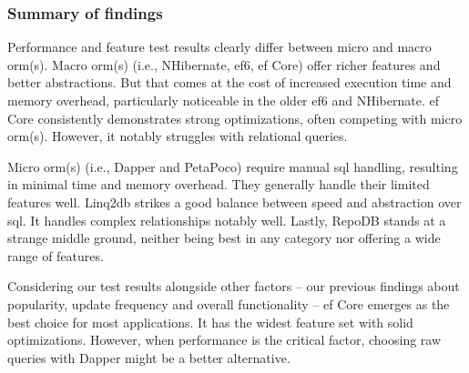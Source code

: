 \subsubsection{Summary of findings}
Performance and feature test results clearly differ between micro and macro \acrshort{orm}(s). Macro \acrshort{orm}(s) (i.e., NHibernate, \acrshort{ef}6, \acrshort{ef} Core) offer richer features and better abstractions. But that comes at the cost of increased execution time and memory overhead, particularly noticeable in the older \acrshort{ef}6 and NHibernate. \acrshort{ef} Core consistently demonstrates strong optimizations, often competing with micro \acrshort{orm}(s). However, it notably struggles with relational queries. 

Micro \acrshort{orm}(s) (i.e., Dapper and PetaPoco) require manual \acrshort{sql} handling, resulting in minimal time and memory overhead. They generally handle their limited features well. Linq2db strikes a good balance between speed and abstraction over \acrshort{sql}. It handles complex relationships notably well. Lastly, RepoDB stands at a strange middle ground, neither being best in any category nor offering a wide range of features.

Considering our test results alongside other factors -- our previous findings about popularity, update frequency and overall functionality -- \acrshort{ef} Core emerges as the best choice for most applications. It has the widest feature set with solid optimizations. However, when performance is the critical factor, choosing raw queries with Dapper might be a better alternative.





